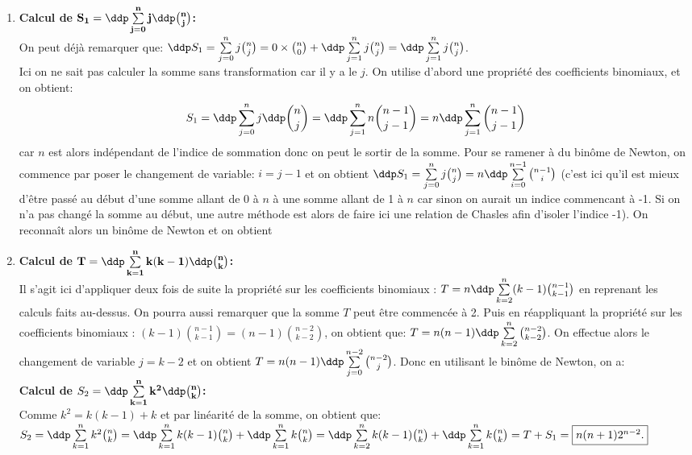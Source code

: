 \begin{correction}   \;
\begin{enumerate}
\item \textbf{Calcul de $\mathbf{S_1=\ddp \sum\limits_{j=0}^n j\ddp \binom{n}{j}}$:}\\
\noindent On peut d\'ej\`{a} remarquer que: $\ddp S_1= \sum\limits_{j=0}^n j\binom{n}{j}=0\times \binom{n}{0}+\ddp \sum\limits_{j=1}^n j\binom{n}{j}=\ddp \sum\limits_{j=1}^n j\binom{n}{j}$. \\
Ici on ne sait pas calculer la somme sans transformation car il y a le $j$. On utilise d'abord une propri\'et\'e des coefficients binomiaux, et on obtient: 
$$S_1=\ddp \sum\limits_{j=0}^n j\ddp \binom{n}{j}=\ddp \sum\limits_{j=1}^n n\binom{n-1}{j-1}=n\ddp \sum\limits_{j=1}^n \binom{n-1}{j-1}$$ 
car $n$ est alors ind\'ependant de l'indice de sommation donc on peut le sortir de la somme. Pour se ramener \`{a} du bin\^{o}me de Newton, on commence par poser le changement de variable: $i=j-1$ et on obtient $\ddp S_1=\sum\limits_{j=0}^n j\binom{n}{j}=n \ddp \sum\limits_{i=0}^{n-1} \binom{n-1}{i}$ (c'est ici qu'il est mieux d'\^{e}tre pass\'e au d\'ebut d'une somme allant de 0 \`{a} $n$ \`{a} une somme allant de 1 \`{a} $n$ car sinon on aurait un indice commencant \`{a} -1. Si on n'a pas chang\'e la somme au d\'ebut, une autre m\'ethode est alors de faire ici une relation de Chasles afin d'isoler l'indice -1). On reconna\^{i}t alors un bin\^{o}me de Newton et on obtient 
\item   \textbf{Calcul de $\mathbf{T=\ddp \sum\limits_{k=1}^n k(k-1)\ddp \binom{n}{k}}$:}\\
\noindent Il s'agit ici d'appliquer deux fois de suite la propri\'et\'e sur les coefficients binomiaux : $T=n\ddp \sum\limits_{k=2}^{n} (k-1)\binom{n-1}{k-1}$ en reprenant les calculs faits au-dessus. On pourra aussi remarquer que la somme $T$ peut \^{e}tre commenc\'ee \`{a} 2. Puis en r\'eappliquant la propri\'et\'e sur les coefficients binomiaux : $(k-1)\binom{n-1}{k-1}=(n-1)\binom{n-2}{k-2}$, on obtient que: $T=n(n-1)\ddp \sum\limits_{k=2}^{n} \binom{n-2}{k-2}$. On effectue alors le changement de variable $j=k-2$ et on obtient $T=n(n-1)\ddp \sum\limits_{j=0}^{n-2} \binom{n-2}{j}$. Donc en utilisant le bin\^{o}me de Newton, on a: \\
\noindent \textbf{Calcul de $S_2=\mathbf{\ddp \sum\limits_{k=1}^n k^2\ddp \binom{n}{k}}$:}\\
\noindent Comme $k^2=k(k-1)+k$ et par lin\'earit\'e de la somme, on obtient que: $S_2=\ddp \sum\limits_{k=1}^{n} k^2\binom{n}{k}=\ddp \sum\limits_{k=1}^{n} k(k-1)\binom{n}{k}+\ddp \sum\limits_{k=1}^{n} k\binom{n}{k}=\ddp \sum\limits_{k=2}^{n} k(k-1)\binom{n}{k}+\ddp \sum\limits_{k=1}^{n} k\binom{n}{k}=T+S_1=\fbox{$n(n+1)2^{n-2}$.}$

\end{enumerate}
\end{correction}
